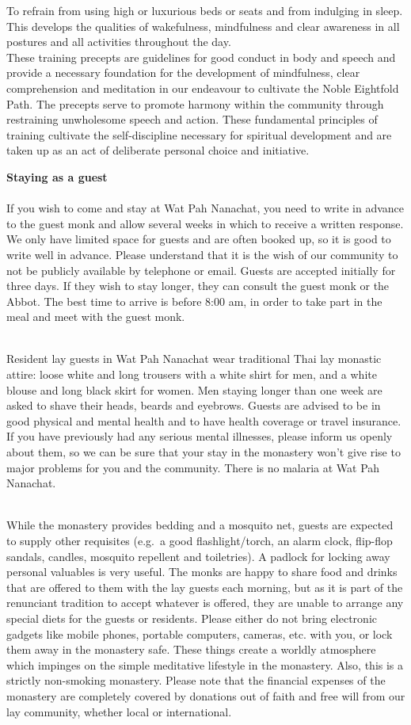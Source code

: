 To refrain from using high or luxurious beds or seats and from indulging
in sleep. This develops the qualities of wakefulness, mindfulness and
clear awareness in all postures and all activities throughout the day.\\
These training precepts are guidelines for good conduct in body and
speech and provide a necessary foundation for the development of
mindfulness, clear comprehension and meditation in our endeavour to
cultivate the Noble Eightfold Path. The precepts serve to promote
harmony within the community through restraining unwholesome speech and
action. These fundamental principles of training cultivate the
self-discipline necessary for spiritual development and are taken up as
an act of deliberate personal choice and initiative.

\textbf{Staying as a guest}\\\\If you wish to come and stay at Wat Pah
Nanachat, you need to write in advance to the guest monk and allow
several weeks in which to receive a written response. We only have
limited space for guests and are often booked up, so it is good to write
well in advance. Please understand that it is the wish of our community
to not be publicly available by telephone or email. Guests are accepted
initially for three days. If they wish to stay longer, they can consult
the guest monk or the Abbot. The best time to arrive is before 8:00 am,
in order to take part in the meal and meet with the guest monk.

\\Resident lay guests in Wat Pah Nanachat wear traditional Thai lay
monastic attire: loose white and long trousers with a white shirt for
men, and a white blouse and long black skirt for women. Men staying
longer than one week are asked to shave their heads, beards and
eyebrows. Guests are advised to be in good physical and mental health
and to have health coverage or travel insurance. If you have previously
had any serious mental illnesses, please inform us openly about them, so
we can be sure that your stay in the monastery won't give rise to major
problems for you and the community. There is no malaria at Wat Pah
Nanachat.

\\While the monastery provides bedding and a mosquito net, guests are
expected to supply other requisites (e.g.~a good flashlight/torch, an
alarm clock, flip-flop sandals, candles, mosquito repellent and
toiletries). A padlock for locking away personal valuables is very
useful. The monks are happy to share food and drinks that are offered to
them with the lay guests each morning, but as it is part of the
renunciant tradition to accept whatever is offered, they are unable to
arrange any special diets for the guests or residents. Please either do
not bring electronic gadgets like mobile phones, portable computers,
cameras, etc. with you, or lock them away in the monastery safe. These
things create a worldly atmosphere which impinges on the simple
meditative lifestyle in the monastery. Also, this is a strictly
non-smoking monastery. Please note that the financial expenses of the
monastery are completely covered by donations out of faith and free will
from our lay community, whether local or international.

